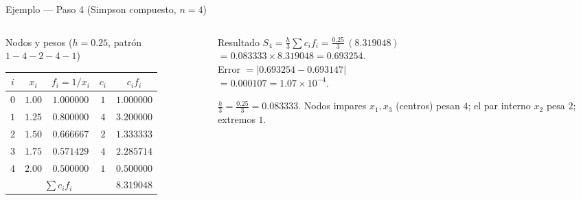 \documentclass[aspectratio=169,10pt]{beamer}
\begin{document}
\begin{frame}{Ejemplo — Paso 4 (Simpson compuesto, $n{=}4$)}
\begin{columns}[T]
\begin{column}{0.52\textwidth}
\begin{cardgear}{Nodos y pesos ($h{=}0.25$, patrón $1{-}4{-}2{-}4{-}1$)}{\faTable}
\centering
{\footnotesize\renewcommand{\arraystretch}{1.3}\setlength{\tabcolsep}{7pt}
\begin{tabular}{c|c|c|c|c}
$i$ & $x_i$ & $f_i=1/x_i$ & $c_i$ & $c_i f_i$\\\hline
$0$ & $1.00$ & $1.000000$ & $1$ & $1.000000$\\
$1$ & $1.25$ & $0.800000$ & $4$ & $3.200000$\\
$2$ & $1.50$ & $0.666667$ & $2$ & $1.333333$\\
$3$ & $1.75$ & $0.571429$ & $4$ & $2.285714$\\
$4$ & $2.00$ & $0.500000$ & $1$ & $0.500000$\\\hline
\multicolumn{4}{c|}{$\sum c_i f_i$} & $8.319048$\\
\end{tabular}}
\end{cardgear}
\end{column}
\begin{column}{0.46\textwidth}
\begin{cardidea}{Resultado}{\faCalculator}
{\footnotesize $\displaystyle S_4=\frac{h}{3}\sum c_i f_i=\frac{0.25}{3}\,(8.319048)$\\[0.5mm]
\hspace*{6mm}$=0.083333\times8.319048=\mathbf{0.693254}$.\\[0.9mm]
Error $=|0.693254-0.693147|$\\[0.2mm]
\hspace*{9mm}$=0.000107=1.07{\times}10^{-4}$.}
\end{cardidea}
\vspace{1mm}
\begin{cardnota}[\faInfoCircle]
{\footnotesize $\tfrac{h}{3}=\tfrac{0.25}{3}=0.083333$. Nodos impares $x_1,x_3$ (centros) pesan $4$; el par interno $x_2$ pesa $2$; extremos $1$.}
\end{cardnota}
\end{column}
\end{columns}
\end{frame}
\end{document}

